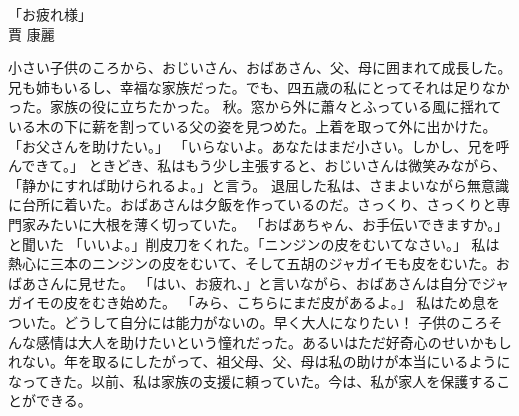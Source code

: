 \documentclass[12pt,a4paper]{article}
\begin{document}
\begin{center}
{\LARGE 「お疲れ様」}\\[1em]
{\large 賈 康麗}
\end{center}

\vspace{1em}
	小さい子供のころから、おじいさん、おばあさん、父、母に囲まれて成長した。兄も姉もいるし、幸福な家族だった。でも、四五歳の私にとってそれは足りなかった。家族の役に立ちたかった。
	秋。窓から外に蕭々とふっている風に揺れている木の下に薪を割っている父の姿を見つめた。上着を取って外に出かけた。
	「お父さんを助けたい。」
	「いらないよ。あなたはまだ小さい。しかし、兄を呼んできて。」
	ときどき、私はもう少し主張すると、おじいさんは微笑みながら、
	「静かにすれば助けられるよ。」と言う。
	退屈した私は、さまよいながら無意識に台所に着いた。おばあさんは夕飯を作っているのだ。さっくり、さっくりと専門家みたいに大根を薄く切っていた。
	「おばあちゃん、お手伝いできますか。」と聞いた
	「いいよ。」削皮刀をくれた。「ニンジンの皮をむいてなさい。」
	私は熱心に三本のニンジンの皮をむいて、そして五胡のジャガイモも皮をむいた。おばあさんに見せた。
	「はい、お疲れ、」と言いながら、おばあさんは自分でジャガイモの皮をむき始めた。
	「みら、こちらにまだ皮があるよ。」
	私はため息をついた。どうして自分には能力がないの。早く大人になりたい！
	子供のころそんな感情は大人を助けたいという憧れだった。あるいはただ好奇心のせいかもしれない。年を取るにしたがって、祖父母、父、母は私の助けが本当にいるようになってきた。以前、私は家族の支援に頼っていた。今は、私が家人を保護することができる。
\end{document}
